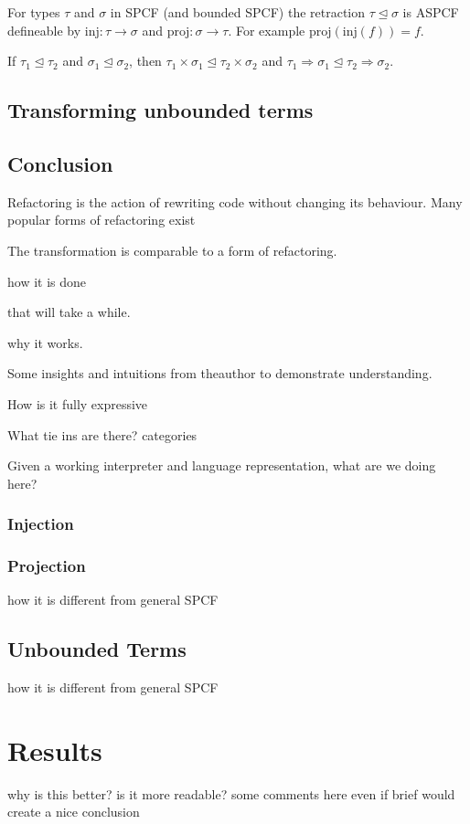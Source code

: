 \documentclass[12pt,a4paper]{report}
\theoremstyle{definition}
\theoremstyle{remark}
\begin{document}
For types $\tau$ and $\sigma$ in SPCF (and bounded SPCF) the retraction $\tau \trianglelefteq \sigma$ is ASPCF defineable by $\text{inj}: \tau \rightarrow \sigma$ and $\text{proj}: \sigma \rightarrow \tau$. For example $\text{proj}(\text{inj}(f))= f$.

If $\tau_1 \trianglelefteq \tau_2$ and $\sigma_1 \trianglelefteq \sigma_2$, then $\tau_1 \times \sigma_1 \trianglelefteq \tau_2 \times \sigma_2$ and $\tau_1 \Rightarrow \sigma_1 \trianglelefteq \tau_2 \Rightarrow \sigma_2 $.

\section{Transforming unbounded terms}

\section{Conclusion}




Refactoring is the action of rewriting code without changing its behaviour. Many popular forms of refactoring exist 

The transformation is comparable to a form of refactoring. 

how it is done 

that will take a while.

why it works.

Some insights and intuitions from theauthor to demonstrate understanding.

How is it fully expressive

What tie ins are there? categories

Given a working interpreter
and language representation, what are we doing here?

\subsection{Injection}
\subsection{Projection}

how it is different from general SPCF
\section{Unbounded Terms}
how it is different from general SPCF

\chapter{Results}
why is this better?
is it more readable?
some comments here even if brief would create a nice conclusion
\end{document}
